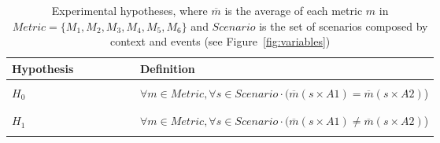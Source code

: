 \begin{table}[ht!]
	\small
	\fontsize{11}{11}\selectfont
	\centering
	\caption{\color{black}Experimental hypotheses, where $\overline{m}$ is the average of each metric $m$ in $Metric=\{M_1, M_2, M_3, M_4, M_5, M_6\}$ and $Scenario$ is the set of scenarios composed by context and events (see Figure~\ref{fig:variables})\color{black}} 
	\label{table:hyp}
	\begin{center}
	\begin{tabularx}{0.95\textwidth}{X p{0.70\linewidth}}
	\hline
		
		\textbf{Hypothesis}
		& \textbf{Definition} \\ [1ex]
	\hline	
	
	\\ $H_0$ & $\forall m \in Metric, \forall s \in Scenario \cdot (\overline{m}(s \times A1)=\overline{m}(s \times A2)$) 
	\\[1ex] \\
	
	\\ $H_1$ & $\forall m \in Metric, \forall s \in Scenario \cdot (\overline{m}(s \times A1) \neq \overline{m}(s \times A2)$) 
	\\[1ex] \\
	
	\hline
	\end{tabularx}
	\end{center}
\end{table} 